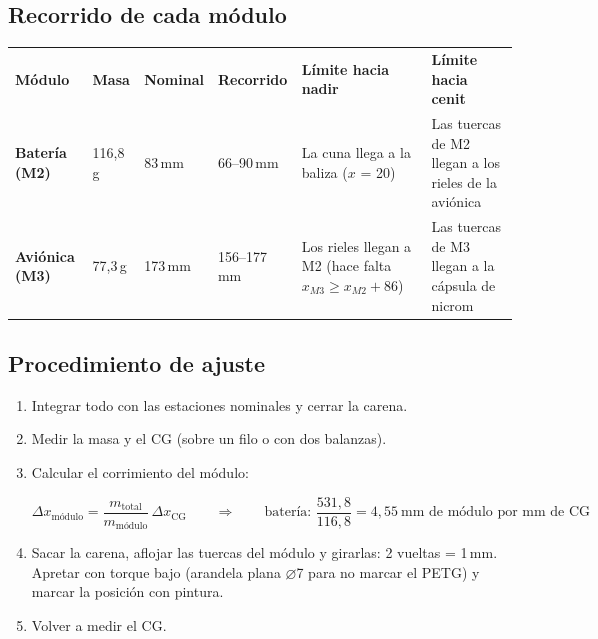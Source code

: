 \documentclass[10pt,a4paper]{article}
\newcommand{\diam}{\ensuremath{\varnothing}}
\begin{document}
\subsection{Recorrido de cada módulo}
\par{\footnotesize\noindent\begin{tabularx}{\linewidth}{P{2.0cm}P{1.1cm}P{1.2cm}P{1.6cm}LL}
\color{white}\bfseries Módulo & \color{white}\bfseries Masa & \color{white}\bfseries Nominal & \color{white}\bfseries Recorrido & \color{white}\bfseries Límite hacia nadir & \color{white}\bfseries Límite hacia cenit \\
\bfseries Batería (M2) & 116,8\,g & 83\,mm & 66--90\,mm & La cuna llega a la baliza ($x$ = 20) & Las tuercas de M2 llegan a los rieles de la aviónica \\
\bfseries Aviónica (M3) & 77,3\,g & 173\,mm & 156--177\,mm & Los rieles llegan a M2 (hace falta $x_{M3} \geq x_{M2} + 86$) & Las tuercas de M3 llegan a la cápsula de nicrom \\
\end{tabularx}}
\par\medskip
\subsection{Procedimiento de ajuste}
\begin{enumerate}
\item Integrar todo con las estaciones nominales y cerrar la carena.
\item Medir la masa y el CG (sobre un filo o con dos balanzas).
\item Calcular el corrimiento del módulo:
\begin{ecu}
\begin{equation}
\Delta x_\text{módulo} = \frac{m_\text{total}}{m_\text{módulo}}\,\Delta x_\text{CG}\qquad\Rightarrow\qquad
\text{batería: } \frac{531,8}{116,8} = 4,55\ \text{mm de módulo por mm de CG}
\end{equation}
\end{ecu}
\item Sacar la carena, aflojar las tuercas del módulo y girarlas: 2 vueltas = 1\,mm. Apretar con torque bajo (arandela plana
\diam7 para no marcar el PETG) y marcar la posición con pintura.
\item Volver a medir el CG.
\end{enumerate}
\end{document}
